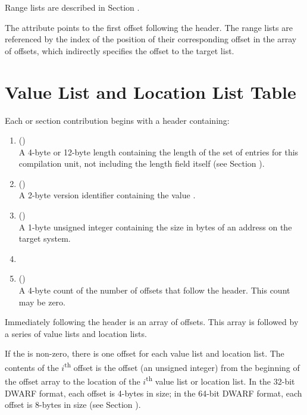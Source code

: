 Range lists are
described in Section .
\db

The \DWATrnglistsbase{} attribute points to the first offset 
following the header. The range lists are referenced
by the index of the position of their corresponding offset in the
array of offsets, which indirectly specifies the offset to the
target list.
 
\bb
\section{Value List and Location List Table}
\label{datarep:locationlisttable}
Each \dotdebugloclists{} or \dotdebugloclistsdwo{} section
contribution
\eb
begins with a header containing:
\begin{enumerate}[1. ]
\item \HFNunitlength{} () \\
A 4-byte or 12-byte length containing the length of
the set of entries for this compilation unit, not
including the length field itself
\bb
(see Section ).
\eb

\item  \HFNversion{} (\HFTuhalf) \\
A 2-byte version identifier containing the value
\versiondotdebugloclists{}.

\item	\HFNaddresssize{} (\HFTubyte) \\
A 1-byte unsigned integer containing the size in
bytes of an address 
\db
on the target system.

\item	\HFNreservedwassegmentselectorsize{} 
\db
\\

\item   \HFNoffsetentrycount{} (\HFTuword) \\
A 4-byte count of the number of offsets
that follow the header. This count may be zero.
\end{enumerate}

Immediately following the header is an array of offsets.
This array is followed by a series of 
\bb
value lists and 
\eb
location lists. 

If the \HFNoffsetentrycount{} is non-zero, there 
is one offset for each 
\bb
value list and 
\eb
location list. The contents
of the $i$\textsuperscript{th} offset is the offset 
(an unsigned integer) from the
beginning of the offset array to the location of the 
$i$\textsuperscript{th} 
\bb
value list or 
\eb
location list. 
In the 32-bit DWARF format, each offset is 4-bytes in size; 
in the 64-bit DWARF format, each offset is 8-bytes in size 
(see Section ).

